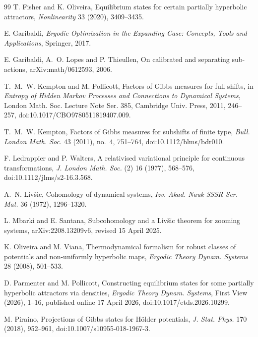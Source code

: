 \documentclass[11pt,a4paper]{article}
\begin{document}
\begin{thebibliography}{99}
T. Fisher and K. Oliveira,
\newblock Equilibrium states for certain partially hyperbolic attractors,
\newblock \emph{Nonlinearity} 33 (2020), 3409--3435.

E. Garibaldi,
\newblock \emph{Ergodic Optimization in the Expanding Case: Concepts,
Tools and Applications},
\newblock Springer, 2017.

E. Garibaldi, A.~O. Lopes and P. Thieullen,
\newblock On calibrated and separating sub-actions,
\newblock arXiv:math/0612593, 2006.


T.~M.~W. Kempton and M. Pollicott,
\newblock Factors of Gibbs measures for full shifts,
\newblock in \emph{Entropy of Hidden Markov Processes and Connections to
Dynamical Systems}, London Math. Soc. Lecture Note Ser. 385,
Cambridge Univ. Press, 2011, 246--257,
\newblock doi:10.1017/CBO9780511819407.009.

T.~M.~W. Kempton,
\newblock Factors of Gibbs measures for subshifts of finite type,
\newblock \emph{Bull. London Math. Soc.} 43 (2011), no.~4, 751--764,
\newblock doi:10.1112/blms/bdr010.

F. Ledrappier and P. Walters,
\newblock A relativised variational principle for continuous transformations,
\newblock \emph{J. London Math. Soc.} (2) 16 (1977), 568--576,
\newblock doi:10.1112/jlms/s2-16.3.568.

A.~N. Liv\v{s}ic,
\newblock Cohomology of dynamical systems,
\newblock \emph{Izv. Akad. Nauk SSSR Ser. Mat.} 36 (1972), 1296--1320.

L. Mbarki and E. Santana,
\newblock Subcohomology and a Liv\v{s}ic theorem for zooming systems,
\newblock arXiv:2208.13209v6, revised 15 April 2025.

K. Oliveira and M. Viana,
\newblock Thermodynamical formalism for robust classes of potentials and
non-uniformly hyperbolic maps,
\newblock \emph{Ergodic Theory Dynam. Systems} 28 (2008), 501--533.

D. Parmenter and M. Pollicott,
\newblock Constructing equilibrium states for some partially hyperbolic
attractors via densities,
\newblock \emph{Ergodic Theory Dynam. Systems}, First View (2026), 1--16,
\newblock published online 17 April 2026, doi:10.1017/etds.2026.10299.


M. Piraino,
\newblock Projections of Gibbs states for H\"older potentials,
\newblock \emph{J. Stat. Phys.} 170 (2018), 952--961,
\newblock doi:10.1007/s10955-018-1967-3.


\end{thebibliography}
\end{document}
